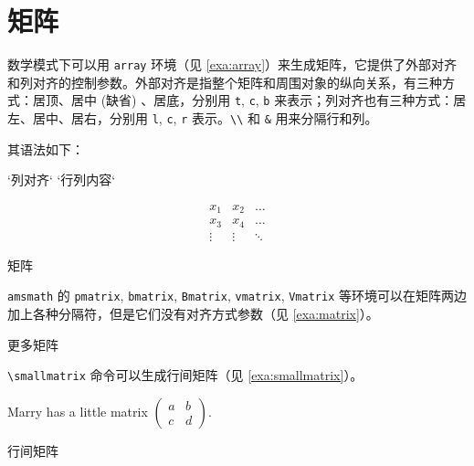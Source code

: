 \section{矩阵}

数学模式下可以用 \texttt{array} 环境（见 \autoref{exa:array}）来生成矩阵，它提供了外部对齐和列对齐的控制参数。外部对齐是指整个矩阵和周围对象的纵向关系，有三种方式：居顶、居中 (缺省) 、居底，分别用 \texttt{t}, \texttt{c}, \texttt{b} 来表示；列对齐也有三种方式：居左、居中、居右，分别用 \texttt{l}, \texttt{c}, \texttt{r} 表示。\verb|\\| 和 \verb|&| 用来分隔行和列。

其语法如下：

\begin{Code}[]
\begin{array}[`外部对齐`]{`列对齐`}
    `行列内容`
\end{array}
\end{Code}

\begin{example}[h]
\begin{RLDemo}[numbers=left]
\[ \begin{array}{ccc}
x_1 & x_2 & \dots \\
x_3 & x_4 & \dots \\
\vdots & \vdots & \ddots
\end{array} \]
\end{RLDemo}
\caption{矩阵}
\label{exa:array}
\end{example}

\texttt{amsmath} 的 \texttt{pmatrix}, \texttt{bmatrix}, \texttt{Bmatrix}, \texttt{vmatrix}, \texttt{Vmatrix} 等环境可以在矩阵两边加上各种分隔符，但是它们没有对齐方式参数（见 \autoref{exa:matrix}）。

\begin{example}[h]
\caption{更多矩阵}
\label{exa:matrix}
\end{example}

\verb|\smallmatrix| 命令可以生成行间矩阵（见 \autoref{exa:smallmatrix}）。

\begin{example}[h]
\begin{BTDemo}[]
Marry has a little matrix $ ( \begin{smallmatrix} 
a&b\\c&d \end{smallmatrix} ) $.
\end{BTDemo}
\caption{行间矩阵}
\label{exa:smallmatrix}
\end{example}

